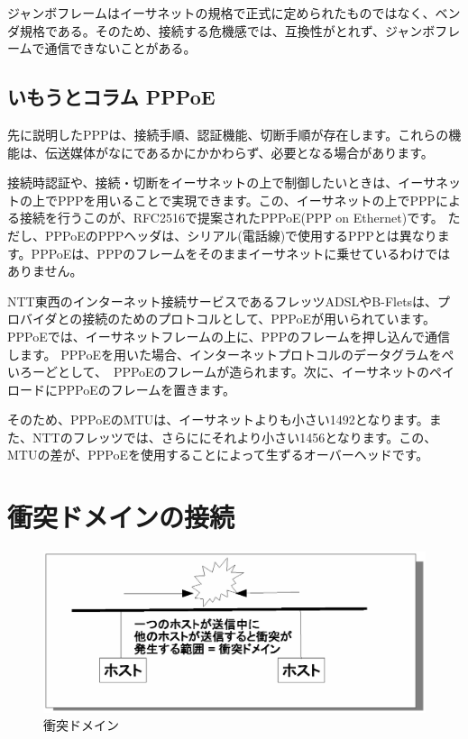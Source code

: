 ジャンボフレームはイーサネットの規格で正式に定められたものではなく、ベンダ規格である。そのため、接続する危機感では、互換性がとれず、ジャンボフレームで通信できないことがある。


\subsection*{いもうとコラム PPPoE}
先に説明したPPPは、接続手順、認証機能、切断手順が存在します。これらの機能は、伝送媒体がなにであるかにかかわらず、必要となる場合があります。

接続時認証や、接続・切断をイーサネットの上で制御したいときは、イーサネットの上でPPPを用いることで実現できます。この、イーサネットの上でPPPによる接続を行うこのが、RFC2516で提案されたPPPoE(PPP on Ethernet)です。
ただし、PPPoEのPPPヘッダは、シリアル(電話線)で使用するPPPとは異なります。PPPoEは、PPPのフレームをそのままイーサネットに乗せているわけではありません。 

NTT東西のインターネット接続サービスであるフレッツADSLやB-Fletsは、プロバイダとの接続のためのプロトコルとして、PPPoEが用いられています。
PPPoEでは、イーサネットフレームの上に、PPPのフレームを押し込んで通信します。
PPPoEを用いた場合、インターネットプロトコルのデータグラムをぺいろーどとして、　PPPoEのフレームが造られます。次に、イーサネットのペイロードにPPPoEのフレームを置きます。

そのため、PPPoEのMTUは、イーサネットよりも小さい1492となります。また、NTTのフレッツでは、さらににそれより小さい1456となります。この、MTUの差が、PPPoEを使用することによって生ずるオーバーヘッドです。





\section{衝突ドメインの接続}

\begin{figure}[htbp]
	\includegraphics[width=12cm,clip]{draw/collisiondomain.eps}
	\caption{衝突ドメイン}
	\label{fig:collisiondomain}
\end{figure}

